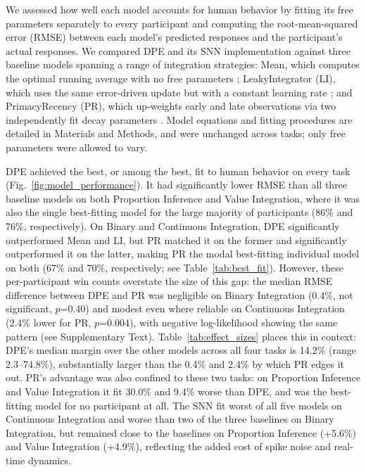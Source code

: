 \begin{ms}
We assessed how well each model accounts for human behavior by fitting its free parameters separately to every participant and computing the root-mean-squared error (RMSE) between each model's predicted responses and the participant's actual responses. We compared DPE and its SNN implementation against three baseline models spanning a range of integration strategies: Mean, which computes the optimal running average with no free parameters \citep{degroot1974reaching}; LeakyIntegrator (LI), which uses the same error-driven update but with a constant learning rate \citep{usher2001time, glaze2015normative}; and PrimacyRecency (PR), which up-weights early and late observations via two independently fit decay parameters \citep{pooley2011understanding, galdo2022quest, yoo2025people}. Model equations and fitting procedures are detailed in Materials and Methods, and were unchanged across tasks; only free parameters were allowed to vary.

DPE achieved the best, or among the best, fit to human behavior on every task (Fig.~\ref{fig:model_performance}). It had significantly lower RMSE than all three baseline models on both Proportion Inference and Value Integration, where it was also the single best-fitting model for the large majority of participants (86\% and 76\%, respectively). On Binary and Continuous Integration, DPE significantly outperformed Mean and LI, but PR matched it on the former and significantly outperformed it on the latter, making PR the modal best-fitting individual model on both (67\% and 70\%, respectively; see Table~\ref{tab:best_fit}). However, these per-participant win counts overstate the size of this gap: the median RMSE difference between DPE and PR was negligible on Binary Integration (0.4\%, not significant, $p$=0.40) and modest even where reliable on Continuous Integration (2.4\% lower for PR, $p$=0.004), with negative log-likelihood showing the same pattern (see Supplementary Text). Table~\ref{tab:effect_sizes} places this in context: DPE's median margin over the other models across all four tasks is 14.2\% (range 2.3--74.8\%), substantially larger than the 0.4\% and 2.4\% by which PR edges it out. PR's advantage was also confined to these two tasks: on Proportion Inference and Value Integration it fit 30.0\% and 9.4\% worse than DPE, and was the best-fitting model for no participant at all. The SNN fit worst of all five models on Continuous Integration and worse than two of the three baselines on Binary Integration, but remained close to the baselines on Proportion Inference (+5.6\%) and Value Integration (+4.9\%), reflecting the added cost of spike noise and real-time dynamics.
\end{ms}

